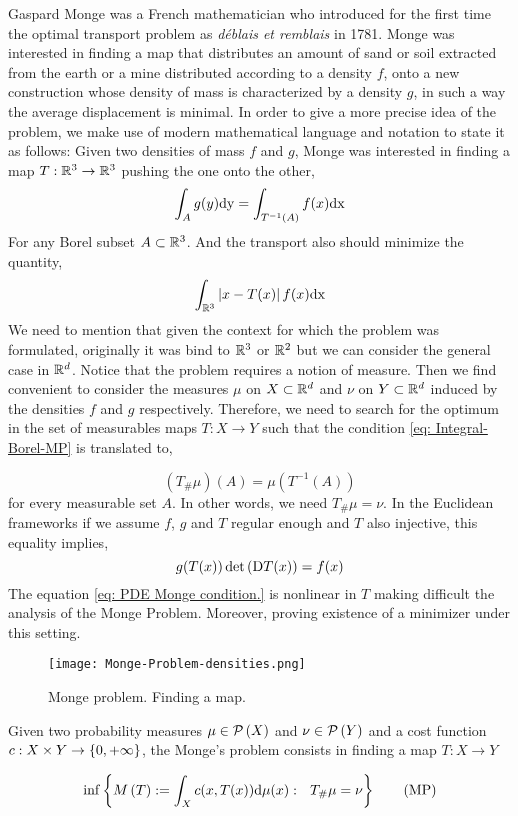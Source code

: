 Gaspard Monge was a French mathematician who introduced for the first time the optimal transport problem as \textit{d\'eblais et remblais} in 1781. Monge was interested in finding a map that distributes an amount of sand or soil extracted from the earth or a mine distributed according to a density $f$, onto a new construction whose density of mass is characterized by a density $g$, in such a way the average displacement is minimal. 
In order to give a more precise idea of the problem, we make use of modern mathematical language and notation to state it as follows: Given two densities of mass $f$ and $g$, Monge was interested in finding a map $T:\mathbb{R}^3\rightarrow\mathbb{R}^3$ pushing the one onto the other,
\begin{equation*}
	\int_A g(y) \mathrm{dy} = \int_{T^{-1}(A)} f(x) \mathrm{dx}  \label{eq: Integral-Borel-MP}
\end{equation*}
For any Borel subset $A\subset\mathbb{R}^3$. And the transport also should minimize the quantity, 
\begin{equation*}
	\int_{\mathbb{R}^3} \left| x-T(x) \right| f(x)\mathrm{dx}
\end{equation*}
We need to mention that given the context for which the problem was formulated, originally it was bind to $\mathbb{R}^3$ or $\mathbb{R}^2$ but we can consider the general case in $\mathbb{R}^d$. Notice that the problem requires a notion of measure. Then we find convenient to consider the measures $\mu$ on $X \subset \mathbb{R}^d$ and $\nu$ on $Y \subset \mathbb{R}^d$ induced by the densities $f$ and $g$ respectively. Therefore, we need to search for the optimum in the set of measurables maps $T:X \rightarrow Y$ such that the condition \eqref{eq: Integral-Borel-MP} is translated to,

\begin{equation}
	(T_\#\mu)(A)=\mu(T^{-1}(A))
\end{equation}
for every measurable set $A$. In other words, we need $T_\# \mu = \nu$.  In the Euclidean frameworks if we assume $f$, $g$ and $T$ regular enough and $T$ also injective, this equality implies,
\begin{equation}
	g(T(x))\det\left( \mathrm{D} T(x) \right)=f(x) \label{eq: PDE Monge condition.}
\end{equation} 
The equation \eqref{eq: PDE Monge condition.} is nonlinear in $T$ making difficult the analysis of the Monge Problem. Moreover, proving existence of a minimizer under this setting.  

\begin{figure}[H]
	\centering
	\caption{Monge problem. Finding a map.}
	\texttt{[image: Monge-Problem-densities.png]}
\end{figure}
\begin{problem} Given two probability measures $\mu \in \mathcal{P}\left( X \right)$ and $\nu \in \mathcal{P}\left( Y \right)$ and a cost function $c: X \times Y \rightarrow \left\lbrace 0, +\infty \right\rbrace$, the Monge's problem consists in finding a map $T:X\rightarrow Y$
	
\begin{equation}
\inf\left\lbrace M\left(T\right):=\int_X c(x, T(x)) \mathrm{d} \mu(x): \ \ T_\# \mu=\nu  \right\rbrace\label{eq: Monge's Problem.}\tag{MP}
\end{equation}
\end{problem}

